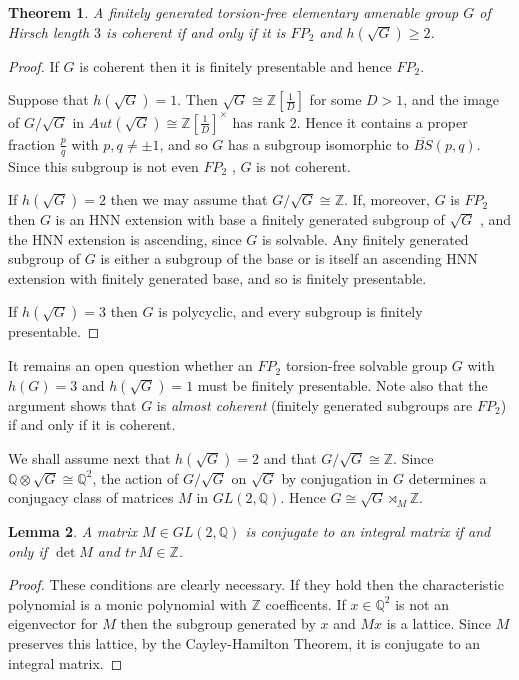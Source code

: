 \documentclass[12pt]{amsart}
\renewcommand{\geq}{\geqslant}
\newtheorem{theorem}{Theorem}
\newtheorem{lemma}[theorem]{Lemma}
\begin{document}
\begin{theorem}
\label{coherence}
A finitely generated torsion-free elementary amenable group $G$ 
of Hirsch length $3$ is coherent if and only if it is $FP_2$ and $h(\sqrt{G})\geq2$.
\end{theorem}

\begin{proof}
If $G$ is coherent then it is finitely presentable and hence $FP_2$.

Suppose that $h(\sqrt{G})=1$. 
Then $\sqrt{G}\cong\mathbb{Z}[\frac1D]$ for some $D>1$,
and the image of $G/\sqrt{G}$ in 
$Aut(\sqrt{G})\cong\mathbb{Z}[\frac1D]^\times$ has rank 2.
Hence it contains a proper fraction $\frac{p}q$ with $p,q\not=\pm1$,
and so $G$ has a subgroup isomorphic to $\overline{BS}(p,q)$.
Since this subgroup is not even $FP_2$ \cite{BS78}, 
$G$ is not coherent.

If $h(\sqrt{G})=2$ then we may assume that
$G/\sqrt{G}\cong\mathbb{Z}$.
If, moreover,  $G$ is $FP_2$ then $G$ is an HNN extension with base 
a finitely generated subgroup of $\sqrt{G}$ \cite{BS78},
and the HNN extension is ascending, 
since $G$ is solvable.
Any finitely generated subgroup of $G$ is either a subgroup of the base or 
is itself an ascending HNN extension with finitely generated base, 
and so is finitely presentable.

If $h(\sqrt{G})=3$ then $G$ is polycyclic, 
and every subgroup is finitely presentable.
\end{proof}

It remains an open question whether an $FP_2$ torsion-free solvable group $G$ 
with $h(G)=3$ and $h(\sqrt{G})=1$ must be finitely presentable.
Note also that the argument shows that $G$ is {\it almost coherent}
(finitely generated subgroups are $FP_2$) if and only if it is coherent.

We shall assume next that $h(\sqrt{G})=2$ and that $G/\sqrt{G}\cong\mathbb{Z}$. Since $\mathbb{Q}\otimes\sqrt{G}\cong\mathbb{Q}^2$,
the action of $G/\sqrt{G}$ on $\sqrt{G}$ by conjugation in $G$ 
determines a conjugacy class of matrices $M$ in $GL(2,\mathbb{Q})$.
Hence $G\cong\sqrt{G}\rtimes_M\mathbb{Z}$. 

\begin{lemma}
\label{Zmatrix}
A matrix $M\in{GL(2,\mathbb{Q})}$ is conjugate to an integral matrix if and only if
$\det{M}$ and $tr\, M\in\mathbb{Z}$.
\end{lemma}

\begin{proof}
These conditions are clearly necessary.
If they hold then the characteristic polynomial is a monic polynomial 
with $\mathbb{Z}$ coefficents.
If $x\in\mathbb{Q}^2$ is not an eigenvector for $M$ then 
the subgroup generated by $x$ and $Mx$ is a lattice.
Since $M$ preserves this lattice, 
by the Cayley-Hamilton Theorem,
 it is conjugate to an integral matrix.
\end{proof}
\end{document}

